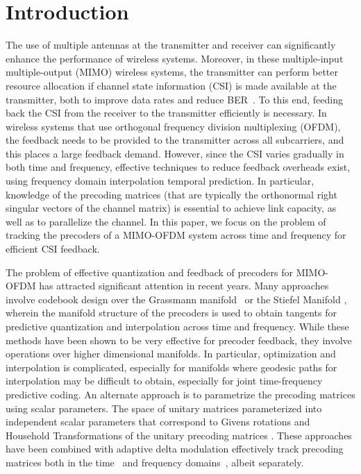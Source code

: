 \documentclass[conference]{IEEEtran}
\begin{document}
  

\section{Introduction} 
\label{intro}

The use of multiple antennas at the transmitter and receiver can significantly enhance the performance of wireless systems. Moreover, in these multiple-input multiple-output (MIMO) wireless systems, the transmitter can perform better resource allocation if channel state information (CSI) is made available at the transmitter, both to improve data rates and reduce BER~\cite{love2008overview}. To this end, feeding back the CSI from the receiver to the transmitter efficiently is necessary. In wireless systems that use orthogonal frequency division multiplexing (OFDM), the feedback needs to be provided to the transmitter across all subcarriers, and this places a large feedback demand. However, since the CSI varies gradually in both time and frequency, effective techniques to reduce feedback overheads exist, using frequency domain interpolation temporal prediction. In particular, knowledge of the precoding matrices (that are typically the orthonormal right singular vectors of the channel matrix) is essential to achieve link capacity, as well as to parallelize the channel. In this paper, we focus on the problem of tracking the precoders of a MIMO-OFDM system across time and frequency for efficient CSI feedback. 
  
The problem of effective quantization and feedback of precoders for MIMO-OFDM has attracted significant attention in recent years. Many approaches involve codebook design over the Grassmann manifold~\cite{mondal2007quantization,schwarz2013adaptive,5946308} or the Stiefel Manifold \cite{6891198,Gupt1905:Predictive}, wherein the manifold structure of the precoders is used to obtain tangents for predictive quantization and interpolation across time and frequency. While these methods have been shown to be very effective for precoder feedback,  they involve operations over higher dimensional manifolds. In particular, optimization and interpolation is complicated, especially for manifolds where geodesic paths for interpolation may be difficult to obtain, especially for joint time-frequency predictive coding. An alternate approach is to parametrize the precoding matrices using scalar parameters. The space of unitary matrices parameterized into independent scalar parameters that correspond to Givens rotations and Household Transformations of the unitary precoding matrices \cite{4114278,4556174}. These approaches have been combined with adaptive delta modulation effectively track precoding matrices both in the time~\cite{4114278} and frequency domains~\cite{4556174}, albeit separately.
\end{document}
